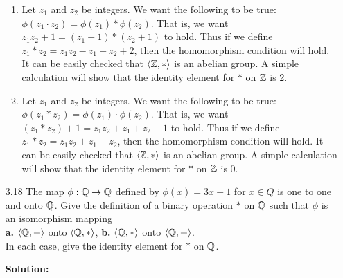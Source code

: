 \begin{enumerate}
      \begin{enumerate}
         \item Let $z_1$ and $z_2$ be integers. We want the following to be
               true: $\phi(z_1 \cdot z_2) = \phi(z_1) * \phi(z_2)$. That is, we 
               want $z_1z_2 + 1 = (z_1 + 1) * (z_2 + 1)$ to hold. Thus if we 
               define $z_1 * z_2 = z_1z_2 - z_1 - z_2 + 2$, then the 
               homomorphism condition will hold. It can be easily checked that
               $\langle \mathbb{Z}, * \rangle$ is an abelian group. A simple calculation will show
               that the identity element for $*$ on $\mathbb{Z}$ is 2.
         \item Let $z_1$ and $z_2$ be integers. We want the following to be
               true: $\phi(z_1 * z_2) = \phi(z_1) \cdot \phi(z_2)$. That is, we 
               want $(z_1 * z_2) + 1 = z_1z_2 + z_1 + z_2 + 1$ to hold. Thus if 
               we define $z_1 * z_2 = z_1z_2 + z_1 + z_2$, then the homomorphism
               condition will hold. It can be easily checked that $\langle \mathbb{Z}, * \rangle$ 
               is an abelian group. A simple calculation will show that the
               identity element for $*$ on $\mathbb{Z}$ is 0.
      \end{enumerate}
   \item[3.18] The map $\phi : \mathbb{Q} \rightarrow \mathbb{Q}$ defined by $\phi(x) = 3x - 1$
               for $x \in Q$ is one to one and onto $\mathbb{Q}$. Give the definition
               of a binary operation $*$ on $\mathbb{Q}$ such that $\phi$ is an
               isomorphism mapping \\
               \textbf{a.} $\langle \mathbb{Q}, + \rangle$ onto $\langle \mathbb{Q}, * \rangle$,
               \qquad\qquad\qquad\qquad\qquad\qquad\qquad\qquad
               \textbf{b.} $\langle \mathbb{Q}, * \rangle$ onto $\langle \mathbb{Q}, + \rangle$. \\
               In each case, give the identity element for $*$ on $\mathbb{Q}$.

      \textbf{Solution:}


\end{enumerate}
